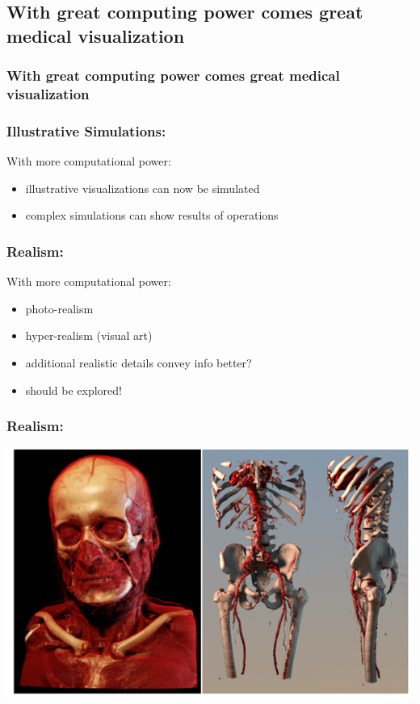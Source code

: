 \documentclass{beamer}
\begin{document}
\subsection{With great computing power comes great medical visualization}
\begin{frame}
	\frametitle{With great computing power comes great medical visualization}
\end{frame}

\begin{frame}
	\frametitle{Illustrative Simulations:}
		With more computational power:
		\begin{itemize}
			\item illustrative visualizations can now be simulated
			\item complex simulations can show results of operations
		\end{itemize}
\end{frame}

\begin{frame}
	\frametitle{Realism:}
		With more computational power:
	\begin{itemize}
		\item photo-realism
		\item hyper-realism (visual art)
		\item additional realistic details convey info better?
		\item should be explored!
	\end{itemize}
\end{frame}

\begin{frame}
	\frametitle{Realism:}
	\includegraphics[width=\textwidth]{images/medical_visualisation}
\end{frame}
\end{document}

